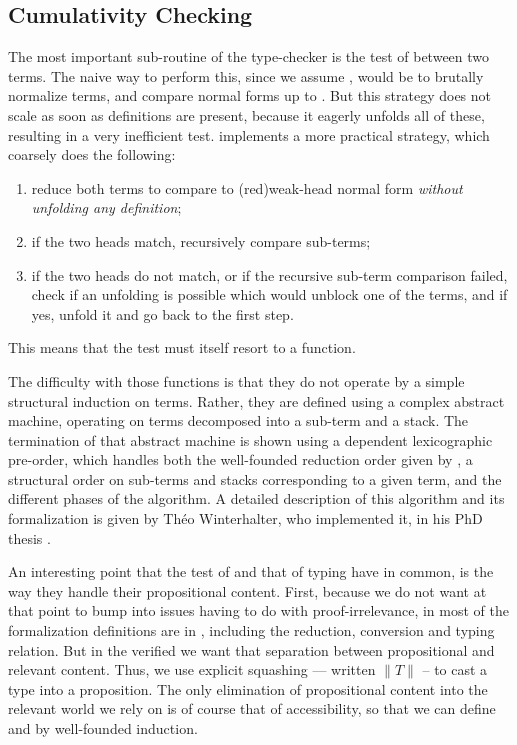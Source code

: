\subsection{Cumulativity Checking}

The most important sub-routine of the type-checker is the test of  between two terms.
The naive way to perform this, since we assume , would be to brutally normalize terms,
and compare normal forms up to .%
But this strategy does not scale as soon as definitions are present, because it
eagerly unfolds all of these, resulting in a very inefficient test.
 implements a more practical strategy, which coarsely does the following:
\begin{enumerate}
  \item reduce both terms to compare to \kl(red){weak-head} normal form
    \emph{without unfolding any definition};
  \item if the two heads match, recursively compare sub-terms;
  \item if the two heads do not match, or if the recursive sub-term comparison failed, check if
    an unfolding is possible which would unblock one of the terms, and if yes, unfold it and
    go back to the first step.
\end{enumerate}
This means that the  test must itself resort to a 
function.

The difficulty with those functions is that they do not operate by a simple structural induction on
terms. Rather, they are defined using a complex abstract machine, operating on terms decomposed into
a sub-term and a stack. The termination of that abstract machine is shown using a
dependent lexicographic pre-order, which handles both the well-founded reduction order given by
, a structural order on sub-terms and stacks corresponding to a given term, and
the different phases of the algorithm.
A detailed description of this algorithm and its formalization%
 is given by Théo Winterhalter,
who implemented it, in his PhD thesis .

An interesting point that the test of  and that of typing have in
common, is the way they handle their propositional content. First, because
we do not want at that point to bump into issues having to do with proof-irrelevance,
in most of the formalization definitions are in ,
including the reduction, conversion and typing relation. But in the verified  we want that
separation between propositional and relevant content. Thus, we use explicit squashing —
written $\| T \|$ – to cast a type into a proposition.%
The only elimination of propositional content into the relevant world we rely on is of course that
of accessibility, so that we can define  and  by well-founded induction.

